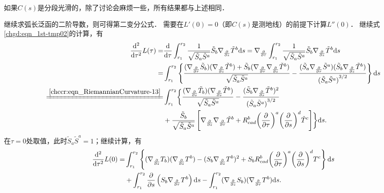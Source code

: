 如果$C(s)$是分段光滑的，除了讨论会麻烦一些，所有结果都与上述相同．


继续求弧长泛函的二阶导数，则可得第二变分公式． %
需要在$L'(0)=0$（即$C(s)$是测地线）的前提下计算$L''(0)$． %
继续式\eqref{chgd:eqn_1st-tmp02}的计算，有
\begin{align*}
    \frac{{\rm d}^2}{{\rm d} \tau^2 }L(\tau)=&   \frac{{\rm d}}{{\rm d} \tau }
    \int_{r_1}^{r_2} \frac{1}{\sqrt{ \tilde{S}_a \tilde{S}^a } }
    \tilde{S}_b \nabla_{\frac{\partial}{\partial s}} \tilde{T}^b {\rm d}s
    =  \nabla_{\frac{\partial}{\partial \tau}}
    \int_{r_1}^{r_2} \frac{1}{\sqrt{ \tilde{S}_a \tilde{S}^a } }
    \tilde{S}_b \nabla_{\frac{\partial}{\partial s}} \tilde{T}^b {\rm d}s  \\
    =& \int_{r_1}^{r_2} \left\{\frac{(\nabla_{\frac{\partial}{\partial \tau}} \tilde{S}_b)
        (\nabla_{\frac{\partial}{\partial s}} \tilde{T}^b)
    +\tilde{S}_b (\nabla_{\frac{\partial}{\partial \tau}} \nabla_{\frac{\partial}{\partial s}} \tilde{T}^b) }
    {\sqrt{ \tilde{S}_a \tilde{S}^a } } - \frac{ (\tilde{S}_a \nabla_{\frac{\partial}{\partial \tau}} \tilde{S}^a)
     (\tilde{S}_b\nabla_{\frac{\partial}{\partial s}} \tilde{T}^b)} {{( \tilde{S}_a \tilde{S}^a) }^{3/2}}  \right\}{\rm d}s \\
    \xlongequal{\ref{chccr:eqn_RiemannianCurvature-13}} &
    \int_{r_1}^{r_2} \biggl\{
    \frac{(\nabla_{\frac{\partial}{\partial s}} \tilde{T}_b) 
    (\nabla_{\frac{\partial}{\partial s}} \tilde{T}^b)}{\sqrt{ \tilde{S}_a \tilde{S}^a } }
    -\frac{(\tilde{S}_b \nabla_{\frac{\partial}{\partial s}} \tilde{T}^b)^2 }
    {{( \tilde{S}_a \tilde{S}^a) }^{3/2}} \\
    &+ \frac{\tilde{S}_b}{\sqrt{ \tilde{S}_a \tilde{S}^a } }\left[
     \nabla_{\frac{\partial}{\partial s}} \nabla_{\frac{\partial}{\partial \tau}} \tilde{T}^b
    + R_{cad}^b{\left(\frac{\partial}{\partial \tau}\right)^a}
    {\left(\frac{\partial}{\partial s}\right)^d}{\tilde{T}^c}\right] \biggr\} {\rm d}s . 
\end{align*}  %
在$\tau=0$处取值，此时$\tilde{S}_a \tilde{S}^a =1$；继续计算，有
\begin{align*}
    \frac{{\rm d}^2}{{\rm d} \tau^2 }L(0)
    =&  \int_{r_1}^{r_2}\left\{ (\nabla_{\frac{\partial}{\partial s}} {T}_b)
      (\nabla_{\frac{\partial}{\partial s}} {T}^b)
      -({S}_b \nabla_{\frac{\partial}{\partial s}} {T}^b)^2
    + {S}_b  R_{cad}^b {\left(\frac{\partial}{\partial \tau}\right)^a}
       {\left(\frac{\partial}{\partial s}\right)^d}{{T}^c}  \right\} {\rm d}s  \\
    & + \int_{r_1}^{r_2}  \frac{\partial}{\partial s} \left( {S}_b
        \nabla_{\frac{\partial}{\partial \tau}} {T}^b    \right) {\rm d}s
      - \int_{r_1}^{r_2} (\nabla_{\frac{\partial}{\partial s}} {S}_b) (
        \nabla_{\frac{\partial}{\partial \tau}} {T}^b) {\rm d}s .
\end{align*}  %
